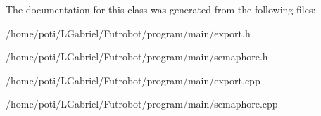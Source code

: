 The documentation for this class was generated from the following files\+:\begin{DoxyCompactItemize}
\item 
/home/poti/\+L\+Gabriel/\+Futrobot/program/main/export.\+h\item 
/home/poti/\+L\+Gabriel/\+Futrobot/program/main/semaphore.\+h\item 
/home/poti/\+L\+Gabriel/\+Futrobot/program/main/export.\+cpp\item 
/home/poti/\+L\+Gabriel/\+Futrobot/program/main/semaphore.\+cpp\end{DoxyCompactItemize}
